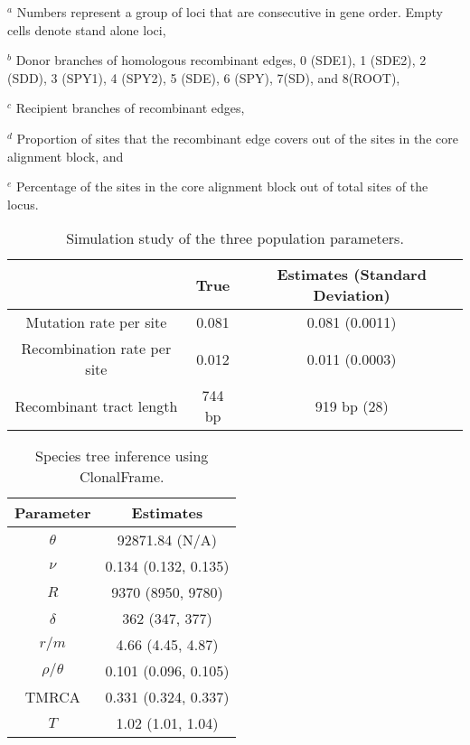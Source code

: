 \documentclass[english]{article}
\providecommand{\tabularnewline}{\\}
\begin{document}
\begin{table}
{$^a$ Numbers represent a group of loci that are consecutive in gene order. Empty
cells denote stand alone loci,

$^b$ Donor branches of homologous recombinant edges, 0 (SDE1), 1 (SDE2), 2
(SDD), 3 (SPY1), 4 (SPY2), 5 (SDE), 6 (SPY), 7(SD), and 8(ROOT),

$^c$ Recipient branches of recombinant edges,

$^d$ Proportion of sites that the recombinant edge covers out of the sites in
the core alignment block, and

$^e$ Percentage of the sites in the core alignment block out of total sites of
the locus.
}

\end{table}
\clearpage{}

\begin{table}
\caption{\label{tab:sim-three-population-parameters}
Simulation study of the three population parameters.}
\noindent \begin{centering}
\begin{tabular}{ccc}
 & True & Estimates (Standard Deviation)\tabularnewline
\hline
Mutation rate per site & 0.081 & 0.081 (0.0011)\tabularnewline
Recombination rate per site & 0.012 & 0.011 (0.0003)\tabularnewline
Recombinant tract length & 744 bp & 919 bp (28)\tabularnewline
\end{tabular}
\par\end{centering}
\end{table}
\clearpage{}

\begin{table}
\caption{\label{tab:clonalframe}Species tree inference using ClonalFrame.}
\noindent \centering{}\begin{tabular}{cc}
Parameter & Estimates\tabularnewline
\hline
$\theta$ & 92871.84 (N/A)\tabularnewline
$\nu$ & 0.134 (0.132, 0.135)\tabularnewline
$R$ & 9370 (8950, 9780)\tabularnewline
$\delta$ & 362 (347, 377)\tabularnewline
$r/m$ & 4.66 (4.45, 4.87)\tabularnewline
$\rho/\theta$ & 0.101 (0.096, 0.105)\tabularnewline
TMRCA & 0.331 (0.324, 0.337)\tabularnewline
$T$ & 1.02 (1.01, 1.04)\tabularnewline
\end{tabular}
\end{table}
\clearpage{}
\end{document}
